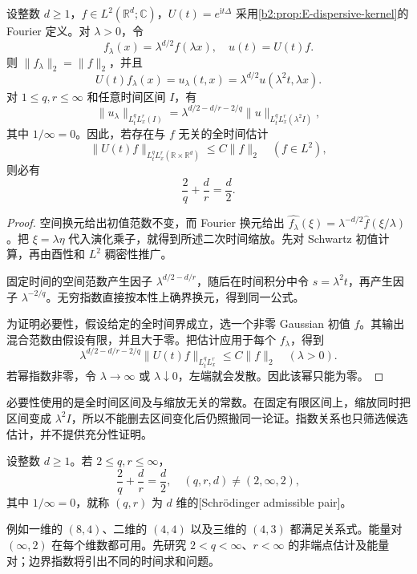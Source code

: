 \begin{proposition}[Schrödinger 缩放]\label{b2:prop:E-schrodinger-scaling}
设整数 \(d\geq1\)，\(f\in L^2(\mathbb R^d;\mathbb C)\)，\(U(t)=e^{\mathrm it\Delta}\) 采用\cref{b2:prop:E-dispersive-kernel}的 Fourier 定义。对 \(\lambda>0\)，令
\[
 f_\lambda(x)=\lambda^{d/2}f(\lambda x),\quad u(t)=U(t)f.
\]
则 \(\|f_\lambda\|_2=\|f\|_2\)，并且
\[
 U(t)f_\lambda(x)
 =u_\lambda(t,x)
 =\lambda^{d/2}u(\lambda^2t,\lambda x).
\]
对 \(1\leq q,r\leq\infty\) 和任意时间区间 \(I\)，有
\begin{equation}\label{b2:eq:E-schrodinger-scaling}
 \|u_\lambda\|_{L^q_tL^r_x(I)}
 =\lambda^{d/2-d/r-2/q}
       \|u\|_{L^q_tL^r_x(\lambda^2I)},
\end{equation}
其中 \(1/\infty=0\)。因此，若存在与 \(f\) 无关的全时间估计
\[
 \|U(t)f\|_{L^q_tL^r_x(\mathbb R\times\mathbb R^d)}
 \leq C\|f\|_2
 \quad(f\in L^2),
\]
则必有
\[
 \frac2q+\frac dr=\frac d2.
\]
\end{proposition}
\begin{proof}
空间换元给出初值范数不变，而 Fourier 换元给出
\(\widehat{f_\lambda}(\xi)=\lambda^{-d/2}\widehat f(\xi/\lambda)\)。把 \(\xi=\lambda\eta\) 代入演化乘子，就得到所述二次时间缩放。先对 Schwartz 初值计算，再由酉性和 \(L^2\) 稠密性推广。

固定时间的空间范数产生因子 \(\lambda^{d/2-d/r}\)，随后在时间积分中令 \(s=\lambda^2t\)，再产生因子 \(\lambda^{-2/q}\)。无穷指数直接按本性上确界换元，得到同一公式。

为证明必要性，假设给定的全时间界成立，选一个非零 Gaussian 初值 \(f\)。其输出混合范数由假设有限，并且大于零。把估计应用于每个 \(f_\lambda\)，得到
\[
 \lambda^{d/2-d/r-2/q}\|U(t)f\|_{L^q_tL^r_x}
 \leq C\|f\|_2\quad(\lambda>0).
\]
若幂指数非零，令 \(\lambda\to\infty\) 或 \(\lambda\downarrow0\)，左端就会发散。因此该幂只能为零。
\end{proof}
必要性使用的是全时间区间及与缩放无关的常数。在固定有限区间上，缩放同时把区间变成 \(\lambda^2I\)，所以不能删去区间变化后仍照搬同一论证。指数关系也只筛选候选估计，并不提供充分性证明。

\begin{definition}\label{b2:def:E-admissible}
设整数 \(d\geq1\)。若 \(2\leq q,r\leq\infty\)，
\[
 \frac2q+\frac dr=\frac d2,\quad(q,r,d)\ne(2,\infty,2),
\]
其中 \(1/\infty=0\)，就称 \((q,r)\) 为 \(d\) 维的[Schrödinger admissible pair]。
\end{definition}
例如一维的 \((8,4)\)、二维的 \((4,4)\) 以及三维的 \((4,3)\) 都满足关系式。能量对 \((\infty,2)\) 在每个维数都可用。先研究 \(2<q<\infty\)、\(r<\infty\) 的非端点估计及能量对；边界指数将引出不同的时间求和问题。

